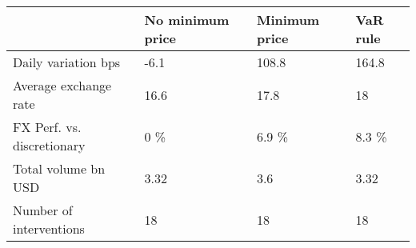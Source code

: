 \begin{tabular}{llll}
\toprule
{} & No minimum price & Minimum price & VaR rule \\
\midrule
Daily variation bps                  &             -6.1 &         108.8 &    164.8 \\
Average exchange rate                &             16.6 &          17.8 &       18 \\
FX Perf. vs. discretionary &              0 \% &         6.9 \% &    8.3 \% \\
Total volume bn USD                  &             3.32 &           3.6 &     3.32 \\
Number of interventions              &               18 &            18 &       18 \\
\bottomrule
\end{tabular}
